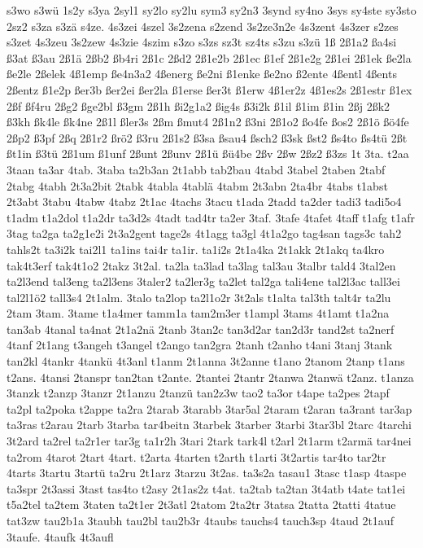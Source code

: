 {s3wo
s3wü
1s2y
s3ya
2syl1
sy2lo
sy2lu
sym3
sy2n3
3synd
sy4no
3sys
sy4ste
sy3sto
2sz2
s3za
s3zä
s4ze.
4s3zei
4szel
3s2zena
s2zend
3s2ze3n2e
4s3zent
4s3zer
s2zes
s3zet
4s3zeu
3s2zew
4s3zie
4szim
s3zo
s3zs
sz3t
sz4ts
s3zu
s3zü
1ß
2ß1a2
ßa4si
ß3at
ß3au
2ß1ä
2ßb2
ßb4ri
2ß1c
2ßd2
2ß1e2b
2ß1ec
ß1ef
2ß1e2g
2ß1ei
2ß1ek
ße2la
ße2le
2ßelek
4ß1emp
ße4n3a2
4ßenerg
ße2ni
ß1enke
ße2no
ß2ente
4ßentl
4ßents
2ßentz
ß1e2p
ßer3b
ßer2ei
ßer2la
ß1erse
ßer3t
ß1erw
4ß1er2z
4ß1es2s
2ß1estr
ß1ex
2ßf
ßf4ru
2ßg2
ßge2bl
ß3gm
2ß1h
ßi2g1a2
ßig4s
ß3i2k
ß1il
ß1im
ß1in
2ßj
2ßk2
ß3kh
ßk4le
ßk4ne
2ß1l
ßler3s
2ßm
ßmut4
2ß1n2
ß3ni
2ß1o2
ßo4fe
ßos2
2ß1ö
ßö4fe
2ßp2
ß3pf
2ßq
2ß1r2
ßrö2
ß3ru
2ß1s2
ß3sa
ßsau4
ßsch2
ß3sk
ßst2
ßs4to
ßs4tü
2ßt
ßt1in
ß3tü
2ß1um
ß1unf
2ßunt
2ßunv
2ß1ü
ßü4be
2ßv
2ßw
2ßz2
ß3zs
1t
3ta.
t2aa
3taan
ta3ar
4tab.
3taba
ta2b3an
2t1abb
tab2bau
4tabd
3tabel
2taben
2tabf
2tabg
4tabh
2t3a2bit
2tabk
4tabla
4tablä
4tabm
2t3abn
2ta4br
4tabs
t1abst
2t3abt
3tabu
4tabw
4tabz
2t1ac
4tachs
3tacu
t1ada
2tadd
ta2der
tadi3
tadi5o4
t1adm
t1a2dol
t1a2dr
ta3d2s
4tadt
tad4tr
ta2er
3taf.
3tafe
4tafet
4taff
t1afg
t1afr
3tag
ta2ga
ta2g1e2i
2t3a2gent
tage2s
4t1agg
ta3gl
4t1a2go
tag4san
tags3c
tah2
tahls2t
ta3i2k
tai2l1
ta1ins
tai4r
ta1ir.
ta1i2s
2t1a4ka
2t1akk
2t1akq
ta4kro
tak4t3erf
tak4t1o2
2takz
3t2al.
ta2la
ta3lad
ta3lag
tal3au
3talbr
tald4
3tal2en
ta2l3end
tal3eng
ta2l3ens
3taler2
ta2ler3g
ta2let
tal2ga
tali4ene
tal2l3ac
tall3ei
tal2l1ö2
tall3s4
2t1alm.
3talo
ta2lop
ta2l1o2r
3t2als
t1alta
tal3th
talt4r
ta2lu
2tam
3tam.
3tame
t1a4mer
tamm1a
tam2m3er
t1ampl
3tams
4t1amt
t1a2na
tan3ab
4tanal
ta4nat
2t1a2nä
2tanb
3tan2c
tan3d2ar
tan2d3r
tand2st
ta2nerf
4tanf
2t1ang
t3angeh
t3angel
t2ango
tan2gra
2tanh
t2anho
t4ani
3tanj
3tank
tan2kl
4tankr
4tankü
4t3anl
t1anm
2t1anna
3t2anne
t1ano
2tanom
2tanp
t1ans
t2ans.
4tansi
2tanspr
tan2tan
t2ante.
2tantei
2tantr
2tanwa
2tanwä
t2anz.
t1anza
3tanzk
t2anzp
3tanzr
2t1anzu
2tanzü
tan2z3w
tao2
ta3or
t4ape
ta2pes
2tapf
ta2pl
ta2poka
t2appe
ta2ra
2tarab
3tarabb
3tar5al
2taram
t2aran
ta3rant
tar3ap
ta3ras
t2arau
2tarb
3tarba
tar4beitn
3tarbek
3tarber
3tarbi
3tar3bl
2tarc
4tarchi
3t2ard
ta2rel
ta2r1er
tar3g
ta1r2h
3tari
2tark
tark4l
t2arl
2t1arm
t2armä
tar4nei
ta2rom
4tarot
2tart
4tart.
t2arta
4tarten
t2arth
t1arti
3t2artis
tar4to
tar2tr
4tarts
3tartu
3tartü
ta2ru
2t1arz
3tarzu
3t2as.
ta3s2a
tasau1
3tasc
t1asp
4taspe
ta3spr
2t3assi
3tast
tas4to
t2asy
2t1as2z
t4at.
ta2tab
ta2tan
3t4atb
t4ate
tat1ei
t5a2tel
ta2tem
3taten
ta2t1er
2t3atl
2tatom
2ta2tr
3tatsa
2tatta
2tatti
4tatue
tat3zw
tau2b1a
3taubh
tau2bl
tau2b3r
4taubs
tauchs4
tauch3sp
4taud
2t1auf
3taufe.
4taufk
4t3aufl
}
